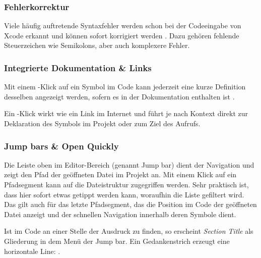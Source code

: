 \documentclass[parskip=half, final]{scrreprt}
\begin{document}

\subsubsection{Fehlerkorrektur}

Viele häufig auftretende Syntaxfehler werden schon bei der Codeeingabe von Xcode erkannt und können sofort korrigiert werden . Dazu gehören fehlende Steuerzeichen wie Semikolons, aber auch komplexere Fehler.


\subsubsection{Integrierte Dokumentation \& Links}\label{sec:quickdef}

Mit einem \keysc{\altkey}-Klick auf ein Symbol im Code kann jederzeit eine kurze Definition desselben angezeigt werden, sofern es in der Dokumentation enthalten ist .


Ein \keysc{\cmdkey}-Klick wirkt wie ein Link im Internet und führt je nach Kontext direkt zur Deklaration des Symbols im Projekt oder zum Ziel des Aufrufs.

\subsubsection{Jump bars \& Open Quickly}

Die Leiste oben im Editor-Bereich (genannt Jump bar) dient der Navigation und zeigt den Pfad der geöffneten Datei im Projekt an. Mit einem Klick auf ein Pfadsegment kann auf die Dateistruktur zugegriffen werden. Sehr praktisch ist, dass hier sofort etwas getippt werden kann, woraufhin die Liste gefiltert wird. Das gilt auch für das letzte Pfadsegment, das die Position im Code der geöffneten Datei anzeigt und der schnellen Navigation innerhalb deren Symbole dient.

 Ist im Code an einer Stelle der Ausdruck  zu finden, so erscheint \emph{Section Title} als Gliederung in dem Menü der Jump bar. Ein Gedankenstrich erzeugt eine horizontale Line: .
\end{document}
